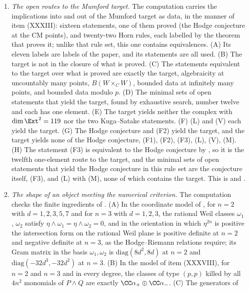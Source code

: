 \begin{enumerate}[label=\textup{(\Roman*)},leftmargin=*]
\item \emph{The open routes to the Mumford target.} The computation carries
  the implications into and out of the Mumford target as data, in the manner of item (XXXIII):
  sixteen statements, one of them proved (the Hodge conjecture at the CM
  points), and twenty-two Horn rules, each labelled by the theorem that proves
  it; unlike that rule set, this one contains equivalences. (A) Its eleven
  labels are labels of the paper, and its statements are all used. (B) The
  target is not in the closure of what is proved. (C) The statements equivalent to the
  target over what is proved are exactly the target, algebraicity at
  uncountably many points, $B(W\times_{C}W)$, bounded data at infinitely many
  points, and bounded data modulo $p$. (D) The minimal sets of open statements
  that yield the target, found by exhaustive search, number twelve and each
  has one element. (E) The target yields neither the complex with
  $\dim\Ext^{2}=119$ nor the two Kuga--Satake statements. (F) \textup{(L)}
  and \textup{(V)} each yield the target. (G) The Hodge conjecture and (F2)
  yield the target, and the target yields none of the Hodge conjecture, (F1),
  (F2), (F3), \textup{(L)}, \textup{(V)}, \textup{(M)}. (H) The statement (F3) is
  equivalent to the Hodge conjecture by , so it is the
  twelfth one-element route to the target, and the minimal sets of open
  statements that yield the Hodge conjecture in this rule set are the
  conjecture itself, (F3), and \textup{(L)} with \textup{(M)}, none of which
  contains the target. This is  and
  .
\item \emph{The shape of an object meeting the numerical criterion.} The
  computation checks the finite ingredients of . (A) In the
  coordinate model of , for $n=2$ with $d=1,2,3,5,7$ and for $n=3$ with
  $d=1,2,3$, the rational Weil classes $\omega_{1}$, $\omega_{2}$ satisfy
  $\eta\wedge\omega_{1}=\eta\wedge\omega_{2}=0$, and in the orientation in
  which $\eta^{2n}$ is positive the intersection form on the rational Weil
  plane is positive definite at $n=2$ and negative definite at $n=3$, as the
  Hodge--Riemann relations require; its Gram matrix in the basis
  $\omega_{1},\omega_{2}$ is $\mathrm{diag}(8d^{2},8d)$ at $n=2$ and
  $\mathrm{diag}(-32d^{3},-32d^{2})$ at $n=3$. (B) In the model of item
  (XXXVIII), for $n=2$ and $n=3$ and in every degree, the classes of type
  $(p,p)$ killed by all $4n^{2}$ monomials of $P\wedge Q$ are exactly
  $\CC\alpha_{+}\oplus\CC\alpha_{-}$. (C) The generators of

\end{enumerate}
